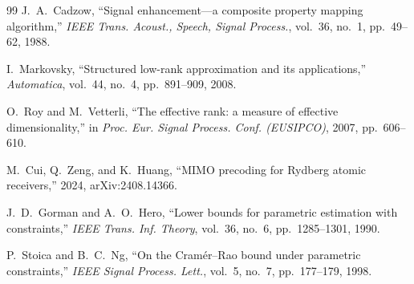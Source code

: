 \documentclass[journal]{IEEEtran}
\begin{document}
\begin{thebibliography}{99}
 J.~A.~Cadzow, ``Signal enhancement---a composite property
mapping algorithm,'' \emph{IEEE Trans. Acoust., Speech, Signal Process.},
vol.~36, no.~1, pp.~49--62, 1988.

 I.~Markovsky, ``Structured low-rank approximation and
its applications,'' \emph{Automatica}, vol.~44, no.~4, pp.~891--909, 2008.

 O.~Roy and M.~Vetterli, ``The effective rank: a
measure of effective dimensionality,'' in \emph{Proc. Eur. Signal Process.
Conf. (EUSIPCO)}, 2007, pp.~606--610.

 M.~Cui, Q.~Zeng, and K.~Huang, ``MIMO precoding for
Rydberg atomic receivers,'' 2024, arXiv:2408.14366.

 J.~D.~Gorman and A.~O.~Hero, ``Lower bounds for parametric
estimation with constraints,'' \emph{IEEE Trans. Inf. Theory}, vol.~36, no.~6,
pp.~1285--1301, 1990.

 P.~Stoica and B.~C.~Ng, ``On the Cram\'er--Rao bound under
parametric constraints,'' \emph{IEEE Signal Process. Lett.}, vol.~5, no.~7,
pp.~177--179, 1998.

\end{thebibliography}
\end{document}
